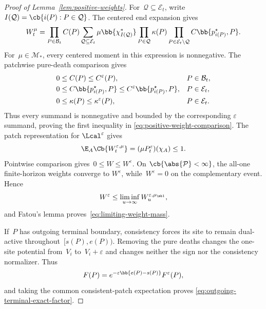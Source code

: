 \begin{proof}[Proof of Lemma~\ref{lem:positive-weights}]
For~$\mathcal Q\subseteq\mathcal E_t$, write
$I(\mathcal Q)=\cb{i(P):P\in\mathcal Q}$. The centered end expansion gives
\begin{equation}
\label{eq:finite-weight-centered-expansion}
W_t^\mu
=
\prod_{P\in\mathcal B_t}C(P)
\sum_{\mathcal Q\subseteq\mathcal E_t}
\mu\bb{\chi_{I(\mathcal Q)}^*}
\prod_{P\in\mathcal Q}\kappa(P)
\prod_{P\in\mathcal E_t\setminus\mathcal Q}
C\bb{p_{i(P)}^\star,P}.
\end{equation}
For~$\mu\in\mathcal M_*$, every centered moment in this expression is
nonnegative. The patchwise pure-death comparison gives
\begin{align*}
0&\leq C(P)\leq C^\varepsilon(P),
&&P\in\mathcal B_t,
\\
0&\leq C\bb{p_{i(P)}^\star,P}
\leq C^\varepsilon\bb{p_{i(P)}^\star,P},
&&P\in\mathcal E_t,
\\
0&\leq\kappa(P)\leq\kappa^\varepsilon(P),
&&P\in\mathcal E_t.
\end{align*}
Thus every summand is nonnegative and bounded by the corresponding
$\varepsilon$ summand, proving the first inequality in
\eqref{eq:positive-weight-comparison}. The patch representation for
$\Lcal^\varepsilon$ gives
\begin{equation*}
\E_A\Cb{W_t^{\varepsilon,\mu}}
=
(\mu P_t^\varepsilon)(\chi_A)
\leq1.
\end{equation*}
Pointwise comparison gives~$0\leq W\leq W^\varepsilon$. On
$\cb{\abs{\mathcal P}<\infty}$, the all-one finite-horizon weights converge to
$W^\varepsilon$, while~$W^\varepsilon=0$ on the complementary event. Hence
\begin{equation*}
W^\varepsilon
\leq
\liminf_{u\to\infty}W_u^{\varepsilon,\mu_{\mb 1}},
\end{equation*}
and Fatou's lemma proves~\eqref{eq:limiting-weight-mass}.

If~$P$ has outgoing terminal boundary, consistency forces its site to remain
dual-active throughout~$[s(P),e(P))$. Removing the pure deaths changes the
one-site potential from~$V_i$ to~$V_i+\varepsilon$ and changes neither the sign
nor the consistency normalizer. Thus
\begin{equation*}
F(P)
=
e^{-\varepsilon\bb{e(P)-s(P)}}F^\varepsilon(P),
\end{equation*}
and taking the common consistent-patch expectation proves
\eqref{eq:outgoing-terminal-exact-factor}.
\end{proof}

